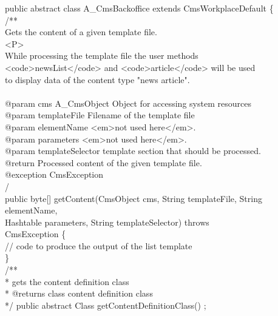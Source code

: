 \begin{java}
public abstract class A\_CmsBackoffice extends CmsWorkplaceDefault \{\\
\jtaba        /**\\
\jtaba         * Gets the content of a given template file.\\
\jtaba         * <P>\\
\jtaba         * While processing the template file the user methods\\
\jtaba         * <code>newsList</code> and <code>article</code> will be used\\
\jtaba         * to display data of the content type "news article".\\
\jtaba         *\\
\jtaba         * @param cms A\_CmsObject Object for accessing system resources\\
\jtaba         * @param templateFile Filename of the template file\\
\jtaba         * @param elementName <em>not used here</em>.\\
\jtaba         * @param parameters <em>not used here</em>.\\
\jtaba         * @param templateSelector template section that should be processed.\\
\jtaba         * @return Processed content of the given template file.\\
\jtaba         * @exception CmsException\\
\jtaba         */\\
         public byte[] getContent(CmsObject cms, String templateFile, String elementName,\\
\jtaba   Hashtable parameters, String templateSelector) throws\\
\jtaba   CmsException \{\\
\jtabb        // code to produce the output of the list template\\
        \}\\
/**\\
 * gets the content definition class\\
 * @returns class content definition class\\
 */
public abstract Class getContentDefinitionClass() ;\\


\end{java}
